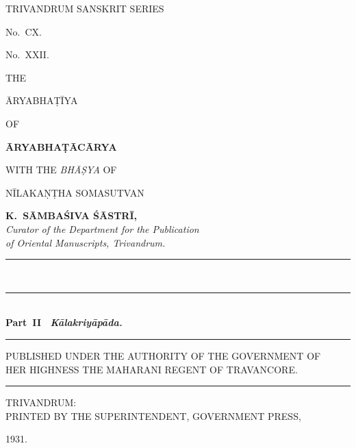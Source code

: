 \documentclass[11pt, openany]{book}
\begin{document}
\begin{center}
\large{\en TRIVANDRUM SANSKRIT SERIES}
 \vspace{0.3cm}

{\en No.~CX.}\\
\vspace{0.3cm}{\en  Śrī Setu Lakṣmī Prasādamālā.}
\vspace{0.3cm}

{\en No.~XXII.}

\vspace{1.5cm} 
{\en THE}

\vspace{0.3cm}
{\LARGE{\en ĀRYABHAṬĪYA}}

\vspace{0.3cm} 

{\en OF} 

\vspace{0.3cm}
\textbf{\en ĀRYABHAṬĀCĀRYA}

\vspace{0.3cm} 

{\footnotesize{\en WITH THE \emph{\en BHĀṢYA} OF}

\vspace{0.2cm} \en NĪLAKAṆṬHA SOMASUTVAN}


\vspace{0.3cm}
\textbf{\en K.~SĀMBAŚIVA ŚĀSTRĪ,}\\
\vspace{0.2cm}
\emph{\en Curator of the Department for the Publication \\
of Oriental Manuscripts, Trivandrum.}\\
\rule{2cm}{0.3mm}\\
\vspace{0.4cm}
\rule{6cm}{0.3mm}\\
{\textbf{Part~II \textendash\ \emph{\en Kālakriyāpāda.}}}\\
\rule{6cm}{0.4mm}
\vspace{0.5cm}

\small{\en PUBLISHED UNDER THE AUTHORITY OF THE GOVERNMENT OF\\
HER HIGHNESS THE MAHARANI REGENT OF TRAVANCORE.}\\
\rule{2cm}{0.3mm}
\vspace{0.3cm}

\small{\en TRIVANDRUM:\\
PRINTED BY THE SUPERINTENDENT, GOVERNMENT PRESS,}

1931.
\end{center}
\end{document}
